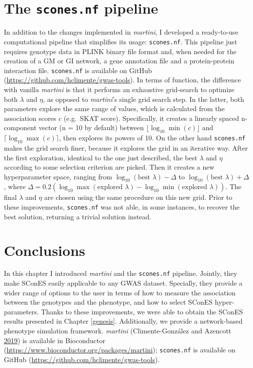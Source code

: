 \documentclass[
  11pt,
]{env/yjiao}
\begin{document}
\hypertarget{the-scones.nf-pipeline}{%
\section{\texorpdfstring{The \texttt{scones.nf} pipeline}{The scones.nf pipeline}}\label{the-scones.nf-pipeline}}

In addition to the changes implemented in \emph{martini}, I developed a ready-to-use computational pipeline that simplifies its usage: \texttt{scones.nf}. This pipeline just requires genotype data in PLINK binary file format and, when needed for the creation of a GM or GI network, a gene annotation file and a protein-protein interaction file. \texttt{scones.nf} is available on GitHub (\url{https://github.com/hclimente/gwas-tools}). In terms of function, the difference with vanilla \emph{martini} is that it performs an exhaustive grid-search to optimize both \(\lambda\) and \(\eta\), as opposed to \emph{martini}'s single grid search step. In the latter, both parameters explore the same range of values, which is calculated from the association scores \(c\) (e.g.~SKAT score). Specifically, it creates a linearly spaced n-component vector (n = 10 by default) between \(\lfloor \log_{10} \min(c) \rfloor\) and \(\lceil \log_{10} \max(c) \rceil\), then explores its powers of 10. On the other hand \texttt{scones.nf} makes the grid search finer, because it explores the grid in an iterative way. After the first exploration, identical to the one just described, the best \(\lambda\) and \(\eta\) according to some selection criterion are picked. Then it creates a new hyperparameter space, ranging from \(\log_{10}(\text{best } \lambda) - \Delta\) to \(\log_{10}(\text{best } \lambda) + \Delta\), where \(\Delta = 0.2(\log_{10}\max{(\text{explored }\lambda)}- \log_{10} \min{(\text{explored }\lambda)})\). The final \(\lambda\) and \(\eta\) are chosen using the same procedure on this new grid. Prior to these improvements, \texttt{scones.nf} was not able, in some instances, to recover the best solution, returning a trivial solution instead.

\hypertarget{conclusions}{%
\section{Conclusions}\label{conclusions}}

In this chapter I introduced \emph{martini} and the \texttt{scones.nf} pipeline. Jointly, they make SConES easily applicable to any GWAS dataset. Specially, they provide a wider range of options to the user in terms of how to measure the association between the genotypes and the phenotype, and how to select SConES hyper-parameters. Thanks to these improvements, we were able to obtain the SConES results presented in Chapter \ref{genesis}. Additionally, we provide a network-based phenotype simulation framework. \emph{martini} (Climente-González and Azencott \protect\hyperlink{ref-martini}{2019}) is available in Bioconductor (\url{https://www.bioconductor.org/packages/martini}); \texttt{scones.nf} is available on GitHub (\url{https://github.com/hclimente/gwas-tools}).
\end{document}
